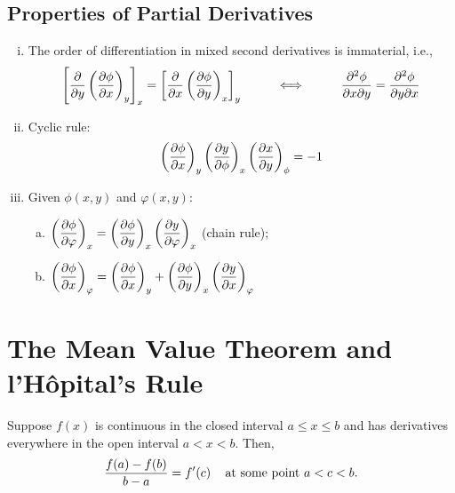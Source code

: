 \subsection{Properties of Partial Derivatives}\label{Appendix_Calculus:Properties}
  \begin{enumerate}[(i)]
%
     \item The order of differentiation in mixed second derivatives is immaterial, i.e.,
        \begin{displaymath}
           \left[\displaystyle\frac{\partial}{\partial y}\left(\displaystyle\frac{\partial\phi}{\partial x}\right)_{y}\right]_{x} = \left[\displaystyle\frac{\partial}{\partial x}\left(\displaystyle\frac{\partial\phi}{\partial y}\right)_{x}\right]_{y} \hspace{1cm}\Longleftrightarrow\hspace{1cm} \displaystyle\frac{\partial^{2}\phi}{\partial x\partial y} = \displaystyle\frac{\partial^{2}\phi}{\partial y\partial x}
        \end{displaymath}
%
     \item Cyclic rule:
        \begin{displaymath}
           \left(\displaystyle\frac{\partial\phi}{\partial x}\right)_{y}\left(\displaystyle\frac{\partial y}{\partial \phi}\right)_{x}\left(\displaystyle\frac{\partial x}{\partial y}\right)_{\phi} = -1
        \end{displaymath}
%
     \item Given $\phi(x,y)$ and $\varphi(x,y)$:
        \begin{enumerate}[(a)]
           \item $\left(\displaystyle\frac{\partial\phi}{\partial\varphi}\right)_{x} = \left(\displaystyle\frac{\partial\phi}{\partial y}\right)_{x}\left(\displaystyle\frac{\partial y}{\partial\varphi}\right)_{x}$  (chain rule);
           \item $\left(\displaystyle\frac{\partial\phi}{\partial x}\right)_{\varphi} = \left(\displaystyle\frac{\partial\phi}{\partial x}\right)_{y} + \left(\displaystyle\frac{\partial\phi}{\partial y}\right)_{x}\left(\displaystyle\frac{\partial y}{\partial x}\right)_{\varphi} $
        \end{enumerate}  
%
  \end{enumerate}

\section{The Mean Value Theorem and l'H\^opital's Rule}\label{Appendix:lHopital}

\begin{theorem}
Suppose $f(x)$ is continuous in the closed interval $a\leq x\leq b$ and has derivatives everywhere in the open interval $a<x<b$. Then,
     \begin{equation}
       \displaystyle\frac{f(a)-f(b)}{b-a} = f'(c)\;\;\;\text{ at some point } a<c<b.
     \end{equation}
\end{theorem}

